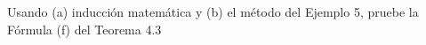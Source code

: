 \item Usando (a) inducción matemática y (b) el método del Ejemplo 5, pruebe la Fórmula (f) del Teorema 4.3
